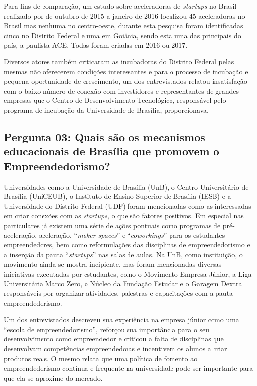 Para fins de comparação, um estudo sobre aceleradoras de \textit{startups} no Brasil realizado por  de outubro de 2015 a janeiro de 2016 localizou 45 aceleradoras no Brasil mas nenhuma no centro-oeste, durante esta pesquisa foram identificadas cinco no Distrito Federal e uma em Goiânia, sendo esta uma das principais do país, a paulista ACE. Todas foram criadas em 2016 ou 2017.

Diversos atores também criticaram as incubadoras do Distrito Federal pelas mesmas não oferecerem condições interessantes e para o processo de incubação e pequena oportunidade de crescimento, um dos entrevistados relatou insatisfação com o baixo número de conexão com investidores e representantes de grandes empresas que o Centro de Desenvolvimento Tecnológico, responsável pelo programa de incubação da Universidade de Brasília, proporcionava.

\subsection*{Pergunta 03: Quais são os mecanismos educacionais de Brasília que promovem o Empreendedorismo?}
\label{subsection:pergunta_de_pesquisa_3}

Universidades como a Universidade de Brasília (UnB), o Centro Universitário de Brasília (UniCEUB), o Instituto de Ensino Superior de Brasília (IESB) e a Universidade do Distrito Federal (UDF) foram mencionadas como as  interessadas em criar conexões com as \textit{startups}, o que são fatores positivos. Em especial nas particulares já existem uma série de ações pontuais como programas de pré-aceleração, aceleração, ``\textit{maker spaces}'' e ``\textit{coworkings}'' para os estudantes empreendedores, bem como reformulações das disciplinas de empreendedorismo e a inserção da pauta ``\textit{startups}'' nas salas de aulas. Na UnB, como instituição, o movimento ainda se mostra incipiente, mas foram mencionadas diversas iniciativas executadas por estudantes, como o Movimento Empresa Júnior, a Liga Universitária Marco Zero, o Núcleo da Fundação Estudar e o Garagem Dextra responsáveis por organizar atividades, palestras e capacitações com a pauta empreendedorismo. 

Um dos entrevistados descreveu sua experiência na empresa júnior como uma ``escola de empreendedorismo'', reforçou sua importância para o seu desenvolvimento como empreendedor e criticou a falta de disciplinas que desenvolvam competências empreendedoras e incentivem os alunos a criar produtos reais. O mesmo relata que uma política de fomento ao empreendedorismo contínua e frequente na universidade pode ser importante para que ela se aproxime do mercado. 

